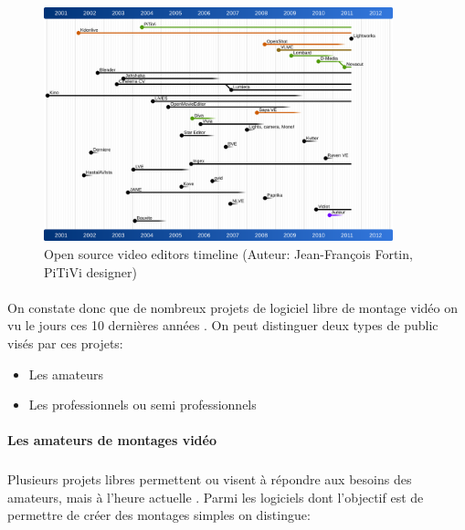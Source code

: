 \begin{figure} [h]
  \begin{center}
    \includegraphics[width=0.9\textwidth]{images/open-source-video-editor-timeline}
  \end{center} \caption{Open source video editors timeline (Auteur:
  Jean-François Fortin, PiTiVi designer)} \label{Yes}
\end{figure}

\paragraph{ }

On constate donc que de nombreux projets de logiciel libre de montage
vidéo on vu le jours ces 10 dernières années%
.  On peut distinguer deux types de public visés par ces projets:

\begin {itemize}

  \item {Les amateurs}

  \item {Les professionnels ou semi professionnels}
\end {itemize}

\paragraph {Les amateurs de montages vidéo}

\subparagraph{}

Plusieurs projets libres permettent ou visent à répondre aux besoins
des amateurs, mais à l'heure actuelle %
. Parmi les logiciels dont l'objectif est de permettre de créer des montages
simples on distingue:

